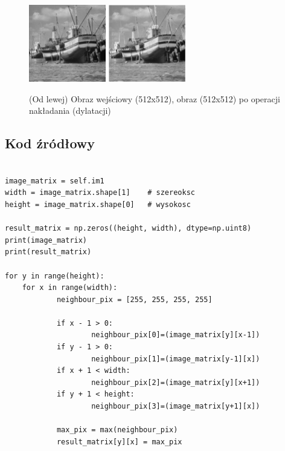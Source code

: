 \documentclass[final,a4paper,openany,12pt]{mwbk}
\begin{document}
\begin{figure}[H]
	\begin{center}
		\includegraphics[width=0.3\textwidth]{2/2Gray_D_Original}
		\includegraphics[width=0.3\textwidth]{2/2Gray_D_Result}
	\end{center}
	\caption{(Od lewej) Obraz wejściowy (512x512), obraz (512x512) po operacji nakładania (dylatacji)}
\end{figure}


\subsection*{Kod źródłowy}

\begin{lstlisting}[caption= Operacja nakładania (dylatacji) na obrazie szarym]

image_matrix = self.im1
width = image_matrix.shape[1]    # szereoksc
height = image_matrix.shape[0]   # wysokosc

result_matrix = np.zeros((height, width), dtype=np.uint8)
print(image_matrix)
print(result_matrix)

for y in range(height):
    for x in range(width):  
            neighbour_pix = [255, 255, 255, 255]

            if x - 1 > 0:
                    neighbour_pix[0]=(image_matrix[y][x-1])
            if y - 1 > 0:
                    neighbour_pix[1]=(image_matrix[y-1][x])
            if x + 1 < width:
                    neighbour_pix[2]=(image_matrix[y][x+1])
            if y + 1 < height:
                    neighbour_pix[3]=(image_matrix[y+1][x])

            max_pix = max(neighbour_pix)
            result_matrix[y][x] = max_pix      


\end{lstlisting}
\end{document}
